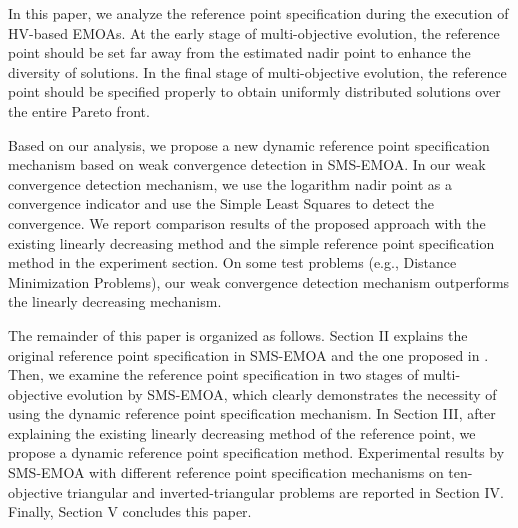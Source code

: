 \documentclass[conference]{IEEEtran}
\begin{document}
In this paper, we analyze the reference point specification during the execution of HV-based EMOAs.
At the early stage of multi-objective evolution, 
the reference point should be set far away from the estimated nadir point to enhance the diversity of solutions. 
In the final stage of multi-objective evolution, 
the reference point should be specified properly to obtain uniformly distributed solutions over the entire Pareto front.

Based on our analysis, we propose a new dynamic reference point specification mechanism based on weak convergence detection in SMS-EMOA. 
In our weak convergence detection mechanism, we use the logarithm nadir point as a convergence indicator
and use the Simple Least Squares\cite{SimpleLeastSquares} to detect the convergence. 
We report comparison results of the proposed approach with the existing linearly decreasing method and 
the simple reference point specification method in the experiment section. 
On some test problems (e.g., Distance Minimization Problems\cite{dmp}), 
our weak convergence detection mechanism outperforms the linearly decreasing mechanism. 

The remainder of this paper is organized as follows. 
Section II explains the original reference point specification in SMS-EMOA and the one proposed in \cite{hisao:RPhowtoSpecify}. 
Then, we examine the reference point specification in two stages of multi-objective evolution by SMS-EMOA, 
which clearly demonstrates the necessity of using the dynamic reference point specification mechanism. 
In Section III, after explaining the existing linearly decreasing method of the reference point, we propose a dynamic reference point
specification method. 
Experimental results by SMS-EMOA with different reference point specification mechanisms 
on ten-objective triangular and inverted-triangular problems are reported in Section IV. 
Finally, Section V concludes this paper. 

%
%
\end{document}
